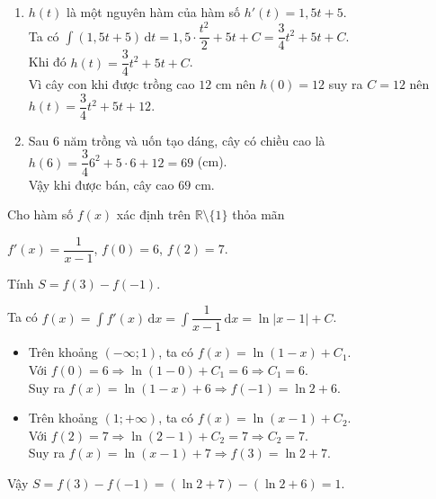 \documentclass[12pt,aspectratio=169]{beamer}
\begin{document}
\begin{baitap}
	\begin{loigiai}
		\begin{enumerate}
			\item $h(t)$ là một nguyên hàm của hàm số $h'(t)=1{,}5t+5$.\\
			Ta có $\displaystyle\int (1{,}5t+5)\mathrm{\,d}t
			=1{,}5\cdot \dfrac{t^2}{2}+5t+C
			=\dfrac{3}{4}t^2+5t+C$.\\
			Khi đó $h(t)=\dfrac{3}{4}{t^2}+5t+C$.\\
			Vì cây con khi được trồng cao $12$ cm nên $h(0)=12$ suy ra $C=12$ nên $h(t)=\dfrac{3}{4}{t^2}+5t+12$.
			\item Sau $6$ năm trồng và uốn tạo dáng, cây có chiều cao là $h(6)=\dfrac{3}{4}{6^2}+5\cdot6+12=69$ (cm).\\
			Vậy khi được bán, cây cao $69$ cm.
		\end{enumerate}
	\end{loigiai}
\end{baitap}

\begin{baitap}%
	Cho hàm số $f(x)$ xác định trên $\mathbb{R}\setminus\{1\}$ thỏa mãn 
	\begin{center}
		$f'(x)=\dfrac{1}{x-1}$, $f(0)=6$, $f(2)=7$.
	\end{center} 
	Tính $S=f(3)-f(-1)$.

	\begin{loigiai}
		Ta có $f(x)=\displaystyle\int f'(x) \mathrm{\,d}x = \displaystyle\int \dfrac{1}{x-1} \mathrm{\,d}x = \ln|x-1| + C$.
		\begin{itemize}
			\item Trên khoảng $(-\infty; 1)$, ta có $f(x)=\ln(1-x)+C_1$.\\
			Với $f(0)=6 \Rightarrow \ln(1-0)+C_1=6 \Rightarrow C_1=6$.\\
			Suy ra $f(x)=\ln(1-x)+6\Rightarrow f(-1)=\ln 2+6$.
			\item Trên khoảng $(1; +\infty)$, ta có $f(x)=\ln(x-1)+C_2$.\\
			Với $f(2)=7 \Rightarrow \ln(2-1)+C_2=7 \Rightarrow C_2=7$.\\
			Suy ra $f(x)=\ln(x-1)+7\Rightarrow f(3)=\ln 2+7$.
		\end{itemize}
		Vậy $S=f(3)-f(-1)=(\ln 2+7)-(\ln 2+6)=1$.
	\end{loigiai}
\end{baitap}
\end{document}
